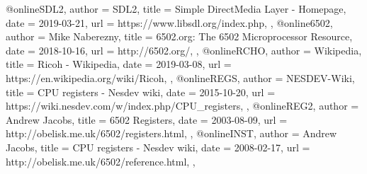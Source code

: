 @online{SDL2,
	author = {SDL2},
	title = {Simple DirectMedia Layer - Homepage},
	date = {2019-03-21},
	url = {https://www.libsdl.org/index.php},
},
@online{6502,
	author = {Mike Naberezny},
	title = {6502.org: The 6502 Microprocessor Resource},
	date = {2018-10-16},
	url = {http://6502.org/},
},
@online{RCHO,
	author = {Wikipedia},
	title = {Ricoh - Wikipedia},
	date = {2019-03-08},
	url = {https://en.wikipedia.org/wiki/Ricoh},
},
@online{REGS,
	author = {NESDEV-Wiki},
	title = {CPU registers - Nesdev wiki},
	date = {2015-10-20},
	url = {https://wiki.nesdev.com/w/index.php/CPU_registers},
},
@online{REG2,
	author = {Andrew Jacobs},
	title = {6502 Registers},
	date = {2003-08-09},
	url = {http://obelisk.me.uk/6502/registers.html},
},
@online{INST,
	author = {Andrew Jacobs},
	title = {CPU registers - Nesdev wiki},
	date = {2008-02-17},
	url = {http://obelisk.me.uk/6502/reference.html},
},

